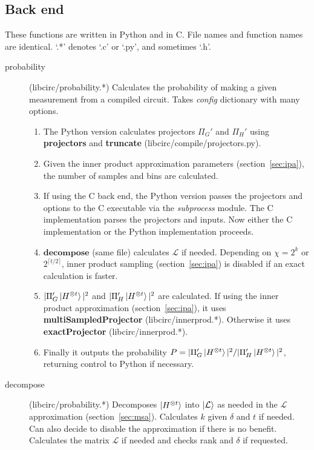\documentclass[11pt]{article}
\begin{document}
\subsection{Back end}
These functions are written in Python and in C. File names and function names are identical. `.*' denotes `.c' or `.py', and sometimes `.h'.

\begin{description}
    \item[probability] (libcirc/probability.*) Calculates the probability of making a given measurement from a compiled circuit. Takes \textit{config} dictionary with many options.
    \begin{enumerate}
        \setlength{\itemsep}{1pt}
        \item The Python version calculates projectors $\Pi_G'$ and $\Pi_H'$ using \textbf{projectors} and \textbf{truncate} (libcirc/compile/projectors.py).
        \item Given the inner product approximation parameters (section~\ref{sec:ipa}), the number of samples and bins are calculated.
        \item If using the C back end, the Python version passes the projectors and options to the C executable via the \textit{subprocess} module. The C implementation parses the projectors and inputs. Now either the C implementation or the Python implementation proceeds.
        \item $\textbf{decompose}$ (same file) calculates $\mathcal{L}$ if needed. Depending on $\chi = 2^k$ or $2^{\lceil t/2 \rceil}$, inner product sampling (section~\ref{sec:ipa}) is disabled if an exact calculation is faster.
            \item $|\Pi_G'\ket{H^{\otimes t}}|^2$ and $|\Pi_H'\ket{H^{\otimes t}}|^2$ are calculated. If using the inner product approximation (section~\ref{sec:ipa}), it uses \textbf{multiSampledProjector} (libcirc/innerprod.*). Otherwise it uses \textbf{exactProjector} (libcirc/innerprod.*).
        \item Finally it outputs the probability $P = |\Pi_G'\ket{H^{\otimes t}}|^2 / |\Pi_H'\ket{H^{\otimes t}}|^2$, returning control to Python if necessary.
    \end{enumerate}
    \item[decompose] (libcirc/probability.*) Decomposes $\ket{H^{\otimes t}}$ into $\ket{\mathcal{L}}$ as needed in the $\mathcal{L}$ approximation (section~\ref{sec:msa}). Calculates $k$ given $\delta$ and $t$ if needed. Can also decide to disable the approximation if there is no benefit. Calculates the matrix $\mathcal{L}$ if needed and checks rank and $\delta$ if requested.

\end{description}
\end{document}
